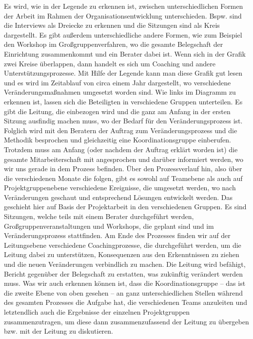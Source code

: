\documentclass[
  letterpaper,
]{book}
\begin{document}
Es wird, wie in der Legende zu erkennen ist, zwischen unterschiedlichen
Formen der Arbeit im Rahmen der Organisationsentwicklung unterschieden.
Bspw. sind die Interviews als Dreiecke zu erkennen und die Sitzungen
sind als Kreis dargestellt. Es gibt außerdem unterschiedliche andere
Formen, wie zum Beispiel den Workshop im Großgruppenverfahren, wo die
gesamte Belegschaft der Einrichtung zusammenkommt und ein Berater dabei
ist. Wenn sich in der Grafik zwei Kreise überlappen, dann handelt es
sich um Coaching und andere Unterstützungsprozesse. Mit Hilfe der
Legende kann man diese Grafik gut lesen und es wird im Zeitablauf von
circa einem Jahr dargestellt, wo verschiedene Veränderungsmaßnahmen
umgesetzt worden sind. Wie links im Diagramm zu erkennen ist, lassen
sich die Beteiligten in verschiedene Gruppen unterteilen. Es gibt die
Leitung, die einbezogen wird und die ganz am Anfang in der ersten
Sitzung ausfindig machen muss, wo der Bedarf für den Veränderungsprozess
ist. Folglich wird mit den Beratern der Auftrag zum Veränderungsprozess
und die Methodik besprochen und gleichzeitig eine Koordinationsgruppe
einberufen. Trotzdem muss am Anfang (oder nachdem der Auftrag erklärt
worden ist) die gesamte Mitarbeiterschaft mit angesprochen und darüber
informiert werden, wo wir uns gerade in dem Prozess befinden. Über den
Prozessverlauf hin, also über die verschiedenen Monate die folgen, gibt
es sowohl auf Teamebene als auch auf Projektgruppenebene verschiedene
Ereignisse, die umgesetzt werden, wo nach Veränderungen geschaut und
entsprechend Lösungen entwickelt werden. Das geschieht hier auf Basis
der Projektarbeit in den verschiedenen Gruppen. Es sind Sitzungen,
welche teils mit einem Berater durchgeführt werden,
Großgruppenveranstaltungen und Workshops, die geplant sind und im
Veränderungsprozess stattfinden. Am Ende des Prozesses finden wir auf
der Leitungsebene verschiedene Coachingprozesse, die durchgeführt
werden, um die Leitung dabei zu unterstützen, Konsequenzen aus den
Erkenntnissen zu ziehen und die neuen Veränderungen verbindlich zu
machen. Die Leitung wird befähigt, Bericht gegenüber der Belegschaft zu
erstatten, was zukünftig verändert werden muss. Was wir auch erkennen
können ist, dass die Koordinationsgruppe -- das ist die zweite Ebene von
oben gesehen -- an ganz unterschiedlichen Stellen während des gesamten
Prozesses die Aufgabe hat, die verschiedenen Teams anzuleiten und
letztendlich auch die Ergebnisse der einzelnen Projektgruppen
zusammenzutragen, um diese dann zusammenzufassend der Leitung zu
übergeben bzw. mit der Leitung zu diskutieren.
\end{document}

